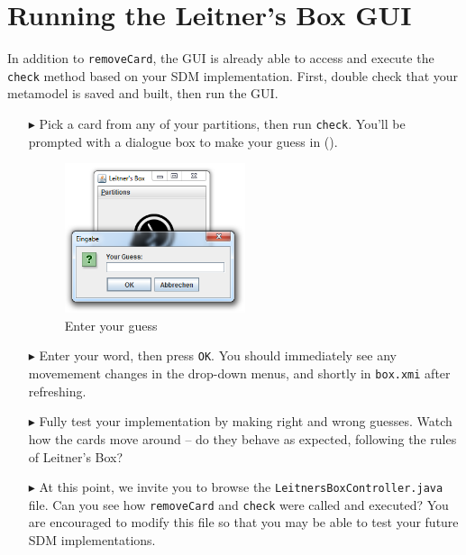 \newpage
\hypertarget{sec:extendGui}{}
\section{Running the Leitner's Box GUI}
\genHeader

In addition to \texttt{removeCard}, the GUI is already able to access and execute the \texttt{check} method based on your SDM implementation. First, double
check that your metamodel is saved and built, then run the GUI. 

\begin{itemize}
\item[$\blacktriangleright$] Pick a card from any of your partitions, then run \texttt{check}. You'll be prompted with a dialogue box to make your guess in
().

\vspace{0.5cm}

\begin{figure}[htp]
\begin{center}
  \includegraphics[width=0.5\textwidth]{gui_checkGuess}
  \caption{Enter your guess}
  \label{eclipse:checkGuess}
\end{center}
\end{figure}

\item[$\blacktriangleright$] Enter your word, then press \texttt{OK}. You should immediately see any movemement changes in the drop-down menus, and shortly in
\texttt{box.xmi} after refreshing.

\vspace{0.5cm}

\item[$\blacktriangleright$] Fully test your implementation by making right and wrong guesses. Watch how the cards move around -- do they
behave as expected, following the rules of Leitner's Box?

\vspace{0.5cm}

\item[$\blacktriangleright$] At this point, we invite you to browse the \texttt{Leitners\-Box\-Control\-ler.java} file. Can you see how \texttt{removeCard} and
\texttt{check} were called and executed? You are encouraged to modify this file so that you may be able to test your future SDM implementations.

\end{itemize}
